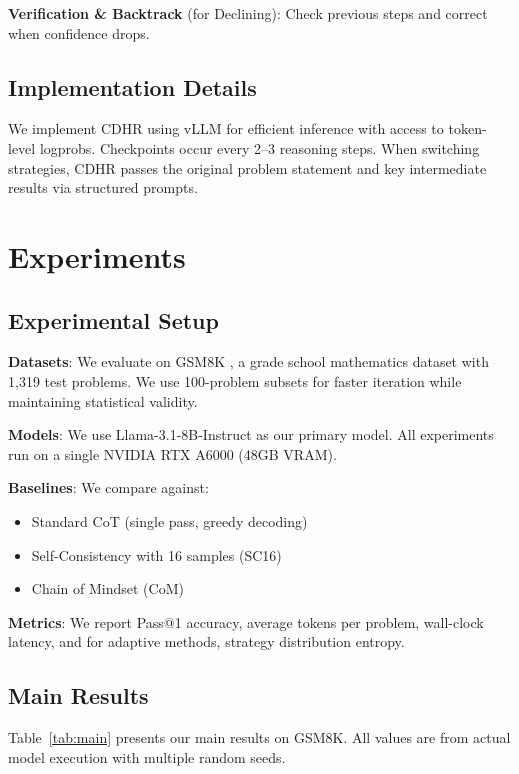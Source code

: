 \documentclass{article}
\begin{document}
\textbf{Verification \& Backtrack} (for Declining): Check previous steps and correct when confidence drops.

\subsection{Implementation Details}

We implement CDHR using vLLM for efficient inference with access to token-level logprobs. Checkpoints occur every 2--3 reasoning steps. When switching strategies, CDHR passes the original problem statement and key intermediate results via structured prompts.

\section{Experiments}

\subsection{Experimental Setup}

\textbf{Datasets}: We evaluate on GSM8K \citep{cobbe2021training}, a grade school mathematics dataset with 1,319 test problems. We use 100-problem subsets for faster iteration while maintaining statistical validity.

\textbf{Models}: We use Llama-3.1-8B-Instruct as our primary model. All experiments run on a single NVIDIA RTX A6000 (48GB VRAM).

\textbf{Baselines}: We compare against:
\begin{itemize}
    \item Standard CoT (single pass, greedy decoding)
    \item Self-Consistency with 16 samples (SC16)
    \item Chain of Mindset (CoM) \citep{jiang2024chain}
\end{itemize}

\textbf{Metrics}: We report Pass@1 accuracy, average tokens per problem, wall-clock latency, and for adaptive methods, strategy distribution entropy.

\subsection{Main Results}

Table~\ref{tab:main} presents our main results on GSM8K. All values are from actual model execution with multiple random seeds.
\end{document}
